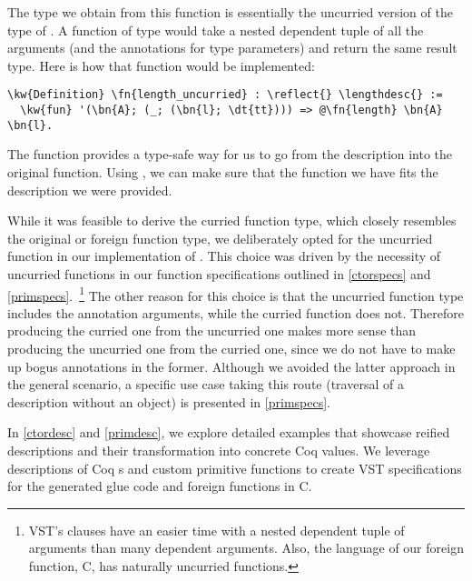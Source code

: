 The type we obtain from this function is essentially the uncurried version of the type of . A function of type  would take a nested dependent tuple of all the arguments (and the annotations for type parameters) and return the same result type. Here is how that function would be implemented: 

\begin{Verbatim}
\kw{Definition} \fn{length_uncurried} : \reflect{} \lengthdesc{} :=
  \kw{fun} '(\bn{A}; (_; (\bn{l}; \dt{tt}))) => @\fn{length} \bn{A} \bn{l}.
\end{Verbatim}

The  function provides a type-safe way for us to go from the description into the original function. Using , we can make sure that the function we have fits the description we were provided. 

While it was feasible to derive the curried function type, which closely resembles the original \constructor{} or \gls{foreign function} type, we deliberately opted for the uncurried function in our implementation of . This choice was driven by the necessity of uncurried functions in our function specifications outlined in \autoref{ctorspecs} and \autoref{primspecs}.~\footnote{VST's  clauses have an easier time with a nested dependent tuple of arguments than many dependent arguments. Also, the language of our \gls{foreign function}, C, has naturally uncurried functions.} 
The other reason for this choice is that the uncurried function type includes the annotation arguments, while the curried function does not. Therefore producing the curried one from the uncurried one makes more sense than producing the uncurried one from the curried one, since we do not have to make up bogus annotations in the former. Although we avoided the latter approach in the general scenario, a specific use case taking this route (traversal of a \reified{} description without an \args{} object) is presented in \autoref{primspecs}.


In \autoref{ctordesc} and \autoref{primdesc}, we explore detailed examples that showcase reified descriptions and their transformation into concrete Coq values. We leverage \reified{} descriptions of Coq \constructor{}s and custom \gls{primitive} functions to create VST specifications for the generated glue code and foreign functions in C.

